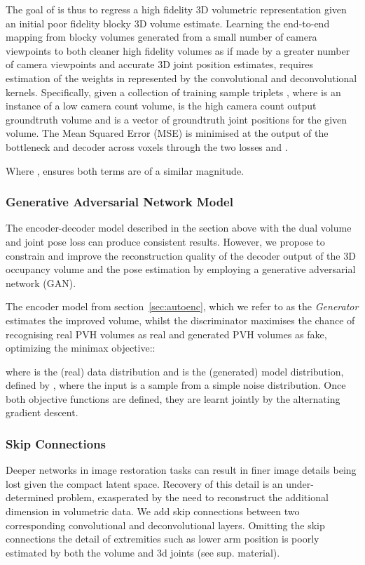 \documentclass{bmvc2k}
\newcommand{\squeezeup}{\vspace{-2mm}}
\begin{document}
The goal of  is thus to regress a high fidelity 3D volumetric representation given an initial poor fidelity blocky  3D volume estimate. Learning the end-to-end mapping from blocky volumes generated from a small number of camera viewpoints to both cleaner high fidelity volumes as if made by a greater number of camera viewpoints and accurate 3D joint position estimates, requires estimation of the weights  in  represented by the convolutional and deconvolutional kernels. Specifically, given a collection of training sample triplets , where  is an instance of a low camera count volume,  is the high camera count output groundtruth volume and  is a vector of groundtruth joint positions for the given volume. The Mean Squared Error (MSE) is minimised at the output of the bottleneck and decoder across  voxels through the two losses  and .




Where , ensures both terms are of a similar magnitude.
\squeezeup
\squeezeup

\subsubsection{Generative Adversarial Network Model}
\label{sec:GAN}
The encoder-decoder model described in the section above with the dual volume and joint pose loss can produce consistent results. However, we propose to constrain and improve the reconstruction quality of the decoder output of the 3D occupancy volume and the pose estimation by employing a generative adversarial network (GAN).

The encoder model from section~\ref{sec:autoenc}, which we refer to as the \emph{Generator}  estimates the improved volume, whilst the discriminator  maximises the chance of recognising real PVH volumes as real and generated PVH volumes as fake, optimizing the minimax objective::

where  is the (real) data distribution and  is the (generated) model distribution, defined by , where the input  is a sample from a simple noise distribution. Once both objective functions are defined, they are learnt jointly by the alternating gradient descent. 

\squeezeup
\squeezeup

\subsubsection{Skip Connections}
Deeper networks in image restoration tasks can result in finer image details being lost given the compact latent space. Recovery of this detail is an under-determined problem, exasperated by the need to reconstruct the additional dimension in volumetric data. We add skip connections between two corresponding convolutional and deconvolutional layers. 
Omitting the skip connections the detail of extremities such as lower arm position is poorly estimated by both the volume and 3d joints (see sup. material).
\squeezeup
\squeezeup
\end{document}
